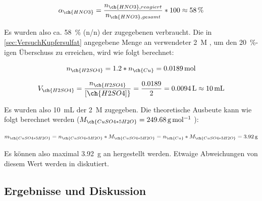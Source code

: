 \documentclass{article}
\begin{document}
        \begin{equation}
          \alpha_{\ch{HNO3}} = \frac{n_{\ch{HNO3}, reagiert}}{n_{\ch{HNO3}, gesamt}} * 100 \approx \SI[mode=text]{58}{\percent} 
        \end{equation}
        
        Es wurden also ca. \SI[mode=text]{58}{\percent} (n/n) der zugegebenen  verbraucht. Die in \ref{sec:VersuchKupfersulfat} angegebene Menge an verwendeter \SI[mode=text]{2}{M} , um den \SI[mode=text]{20}{\percent}-igen Überschuss zu erreichen, wird wie folgt berechnet:
        
        \begin{equation}
          n_{\ch{H2SO4}} = 1.2 * n_{\ch{Cu}} = \SI[mode=text]{0.0189}{\mole} 
        \end{equation}
        
        \begin{equation}
          V_{\ch{H2SO4}} = \frac{n_{\ch{H2SO4}}}{[\ch{H2SO4]}} = \frac{0.0189}{2} = \SI[mode=text]{0.0094}{\liter} \approx \SI[mode=text]{10}{\milli\liter}
        \end{equation}
      
        Es wurden also \SI[mode=text]{10}{\milli\liter} der \SI[mode=text]{2}{M}  zugegeben. Die theoretische Ausbeute kann wie folgt berechnet werden ($M_{\ch{CuSO4 * 5 H2O}} = \SI[mode=text]{249.68}{\gram\per\mole}$ ):
        
        \begin{equation}
          m_{\ch{CuSO4 * 5 H2O}} = n_{\ch{CuSO4 * 5 H2O}} * M_{\ch{CuSO4 * 5 H2O}} = n_{\ch{Cu}}  * M_{\ch{CuSO4 * 5 H2O}} = \SI[mode=text]{3.92}{\gram}
        \end{equation}
        
        Es können also maximal \SI[mode=text]{3.92}{\gram} an  hergestellt werden. Etwaige Abweichungen von diesem Wert werden in \label{sec:ErgebnisseCupfer} diskutiert.
        
    \subsection{Ergebnisse und Diskussion} \label{sec:ErgebnisseCupfer}
      
\end{document}
